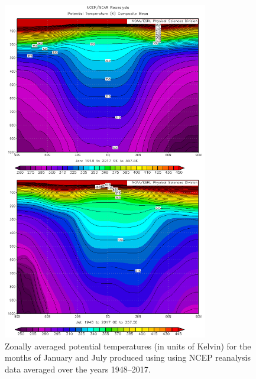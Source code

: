 \documentclass[11pt]{article}
\begin{document}
\begin{figure}[h!]
  \centering
  \includegraphics[width=0.8\textwidth]{theta_janjul.png}
  \caption{Zonally averaged potential temperatures (in units of Kelvin) for the months of January and July produced using using NCEP reanalysis data averaged over the years 1948--2017.}
  \label{fig:theta}
\end{figure}
\end{document}
